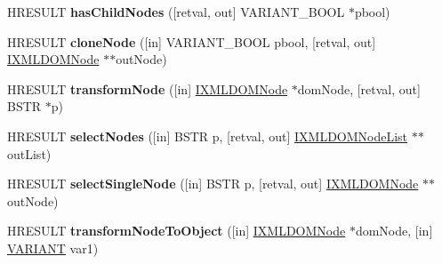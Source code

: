 \begin{DoxyCompactItemize}
\mbox{\label{interface_m_s_x_m_l2_1_1_i_x_m_l_d_o_m_node_a2ef5f6b6a9eff7df317a0d26ac952210}} 
H\+R\+E\+S\+U\+LT {\bfseries has\+Child\+Nodes} (\mbox{[}retval, out\mbox{]} V\+A\+R\+I\+A\+N\+T\+\_\+\+B\+O\+OL $\ast$pbool)
\item 
\mbox{\label{interface_m_s_x_m_l2_1_1_i_x_m_l_d_o_m_node_ab53e84405dca4f13e68d9a37e8da7f55}} 
H\+R\+E\+S\+U\+LT {\bfseries clone\+Node} (\mbox{[}in\mbox{]} V\+A\+R\+I\+A\+N\+T\+\_\+\+B\+O\+OL pbool, \mbox{[}retval, out\mbox{]} \hyperlink{interface_m_s_x_m_l2_1_1_i_x_m_l_d_o_m_node}{I\+X\+M\+L\+D\+O\+M\+Node} $\ast$$\ast$out\+Node)
\item 
\mbox{\label{interface_m_s_x_m_l2_1_1_i_x_m_l_d_o_m_node_a93bef1a13f888dab77c0720af2dfba76}} 
H\+R\+E\+S\+U\+LT {\bfseries transform\+Node} (\mbox{[}in\mbox{]} \hyperlink{interface_m_s_x_m_l2_1_1_i_x_m_l_d_o_m_node}{I\+X\+M\+L\+D\+O\+M\+Node} $\ast$dom\+Node, \mbox{[}retval, out\mbox{]} B\+S\+TR $\ast$p)
\item 
\mbox{\label{interface_m_s_x_m_l2_1_1_i_x_m_l_d_o_m_node_aee1b87bb5385e21a7482f06ff13bc513}} 
H\+R\+E\+S\+U\+LT {\bfseries select\+Nodes} (\mbox{[}in\mbox{]} B\+S\+TR p, \mbox{[}retval, out\mbox{]} \hyperlink{interface_m_s_x_m_l2_1_1_i_x_m_l_d_o_m_node_list}{I\+X\+M\+L\+D\+O\+M\+Node\+List} $\ast$$\ast$out\+List)
\item 
\mbox{\label{interface_m_s_x_m_l2_1_1_i_x_m_l_d_o_m_node_a05e0b3ae6fa583270efd2918672738f4}} 
H\+R\+E\+S\+U\+LT {\bfseries select\+Single\+Node} (\mbox{[}in\mbox{]} B\+S\+TR p, \mbox{[}retval, out\mbox{]} \hyperlink{interface_m_s_x_m_l2_1_1_i_x_m_l_d_o_m_node}{I\+X\+M\+L\+D\+O\+M\+Node} $\ast$$\ast$out\+Node)
\item 
\mbox{\label{interface_m_s_x_m_l2_1_1_i_x_m_l_d_o_m_node_a2ef79fb5cd05ac39f090b0035cb6d651}} 
H\+R\+E\+S\+U\+LT {\bfseries transform\+Node\+To\+Object} (\mbox{[}in\mbox{]} \hyperlink{interface_m_s_x_m_l2_1_1_i_x_m_l_d_o_m_node}{I\+X\+M\+L\+D\+O\+M\+Node} $\ast$dom\+Node, \mbox{[}in\mbox{]} \hyperlink{structtag_v_a_r_i_a_n_t}{V\+A\+R\+I\+A\+NT} var1)
$$
\end{DoxyCompactItemize}
